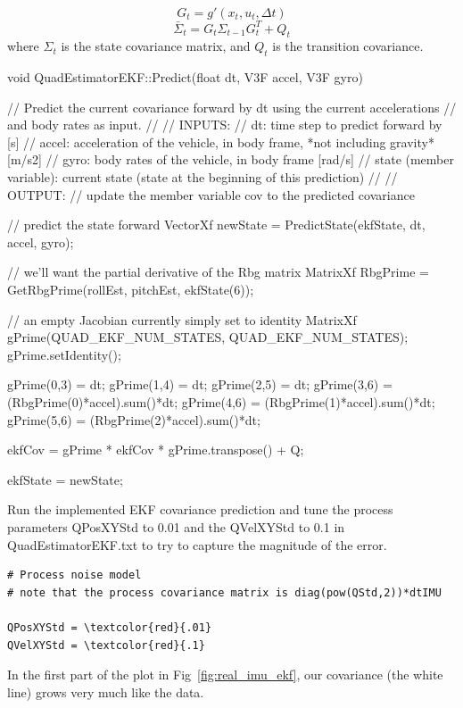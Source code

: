 \documentclass[letterpaper]{article}
\begin{document}
$$G_t = g'(x_t, u_t, \Delta t)$$
$$\bar{\Sigma}_t = G_t\Sigma_{t-1}G_t^T + Q_t$$
where $\Sigma_t$ is the state covariance matrix, and $Q_t$ is the transition covariance.

\begin{CPP}
void QuadEstimatorEKF::Predict(float dt, V3F accel, V3F gyro)
{
    // Predict the current covariance forward by dt using the current accelerations 
    // and body rates as input.
    //
    // INPUTS: 
    //   dt: time step to predict forward by [s]
    //   accel: acceleration of the vehicle, in body frame, *not including gravity* [m/s2]
    //   gyro: body rates of the vehicle, in body frame [rad/s]
    //   state (member variable): current state (state at the beginning of this prediction)
    //   
    // OUTPUT:
    //   update the member variable cov to the predicted covariance

    // predict the state forward
    VectorXf newState = PredictState(ekfState, dt, accel, gyro);

    // we'll want the partial derivative of the Rbg matrix
    MatrixXf RbgPrime = GetRbgPrime(rollEst, pitchEst, ekfState(6));

    // an empty Jacobian currently simply set to identity
    MatrixXf gPrime(QUAD_EKF_NUM_STATES, QUAD_EKF_NUM_STATES);
    gPrime.setIdentity();

    gPrime(0,3) = dt;
    gPrime(1,4) = dt;
    gPrime(2,5) = dt;
    gPrime(3,6) = (RbgPrime(0)*accel).sum()*dt;
    gPrime(4,6) = (RbgPrime(1)*accel).sum()*dt;
    gPrime(5,6) = (RbgPrime(2)*accel).sum()*dt;

    ekfCov = gPrime * ekfCov * gPrime.transpose() + Q;

    ekfState = newState;
}
\end{CPP}

Run the implemented EKF covariance prediction and tune the process parameters QPosXYStd to 0.01 and the QVelXYStd to 0.1 in QuadEstimatorEKF.txt to try to capture the magnitude of the error. 

\begin{Verbatim}[frame=single, commandchars=\\\{\}]
# Process noise model
# note that the process covariance matrix is diag(pow(QStd,2))*dtIMU

QPosXYStd = \textcolor{red}{.01}
QVelXYStd = \textcolor{red}{.1}
\end{Verbatim}

In the first part of the plot in Fig~\ref{fig:real_imu_ekf}, our covariance (the white line) grows very much like the data.
\end{document}
